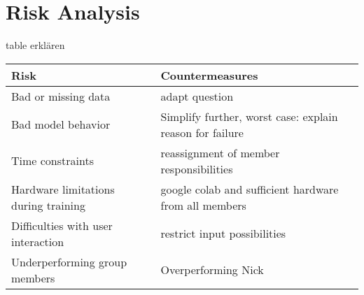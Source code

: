 \documentclass[lang=english,inputenc=utf8,fontsize=10pt]{ldvarticle}
\begin{document}
\begin{center}
\begin{footnotesize}
\begin{tabular}[htb]{|m{}|p{.3cm}|p{.3cm}|p{.3cm}|p{.3cm}|p{.3cm}|p{.3cm}|p{.3cm}|p{.3cm}|p{.3cm}|p{.3cm}|p{.3cm}|p{.3cm}|p{.3cm}|p{.3cm}|p{.3cm}|p{.3cm}|p{.3cm}|}
\end{tabular}
\end{footnotesize}
\end{center}

\newpage

\section{Risk Analysis}

table erklären

\begin{center}
	\begin{footnotesize}
		\setlength{\arrayrulewidth}{1,05pt}
		\begin{tabular}[htb]{|p{5cm}|p{7.1cm}|}
			\hline
			\textbf{Risk} & \textbf{Countermeasures} \\
			\hline
			\hline
			\rowcolor{lightgray} Bad or missing data & adapt question \\
			\hline
			\rowcolor{lightgray} Bad model behavior & Simplify further, worst case: explain reason for failure \\
			\hline	
			\rowcolor{lightgray} Time constraints & reassignment of member responsibilities \\
			\hline
			\rowcolor{lightgray} Hardware limitations during training & google colab and sufficient hardware from all members\\
			\hline
			\rowcolor{lightgray} Difficulties with user interaction & restrict input possibilities \\
			\hline
			\rowcolor{lightgray} Underperforming group members & Overperforming Nick \\
			\hline	
		\end{tabular}
	\end{footnotesize}
\end{center}
\end{document}
